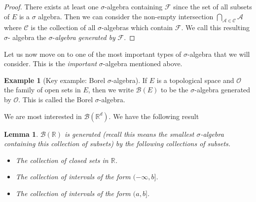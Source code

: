 \documentclass[
]{book}
\providecommand{\tightlist}{%
  \setlength{\itemsep}{0pt}\setlength{\parskip}{0pt}}
\newtheorem{lemma}{Lemma}[chapter]
\theoremstyle{definition}
\theoremstyle{definition}
\newtheorem{example}{Example}[chapter]
\theoremstyle{definition}
\theoremstyle{definition}
\theoremstyle{remark}
\begin{document}
\begin{proof}
There exists at least one \(\sigma\)-algebra containing \(\mathcal{F}\) since the set of all subsets of \(E\) is a \(\sigma\) algebra. Then we can consider the non-empty intersection \(\bigcap_{\mathcal{A} \in \mathcal{C}} \mathcal{A}\) where \(\mathcal{C}\) is the collection of all \(\sigma\)-algebras which contain \(\mathcal{F}\). We call this resulting \(\sigma\)- algebra the \(\sigma\)-\emph{algebra generated by} \(\mathcal{F}\).
\end{proof}

Let us now move on to one of the most important types of \(\sigma\)-algebra that we will consider. This is the \emph{important} \(\sigma\)-algebra mentioned above.

\begin{example}[Key example: Borel $\sigma$-algebra]
If \(E\) is a topological space and \(\mathcal{O}\) the family of open sets in \(E\), then we write \(\mathcal{B}(E)\) to be the \(\sigma\)-algebra generated by \(\mathcal{O}\). This is called the Borel \(\sigma\)-algebra.
\end{example}

We are most interested in \(\mathcal{B}(\mathbb{R}^d)\). We have the following result

\begin{lemma}

\(\mathcal{B}(\mathbb{R})\) is generated (recall this means the smallest \(\sigma\)-algebra containing this collection of subsets) by the following collections of subsets.

\begin{itemize}
\tightlist
\item
  The collection of closed sets in \(\mathbb{R}\).
\item
  The collection of intervals of the form \((-\infty, b]\).
\item
  The collection of intervals of the form \((a,b]\).
\end{itemize}

\end{lemma}
\end{document}
